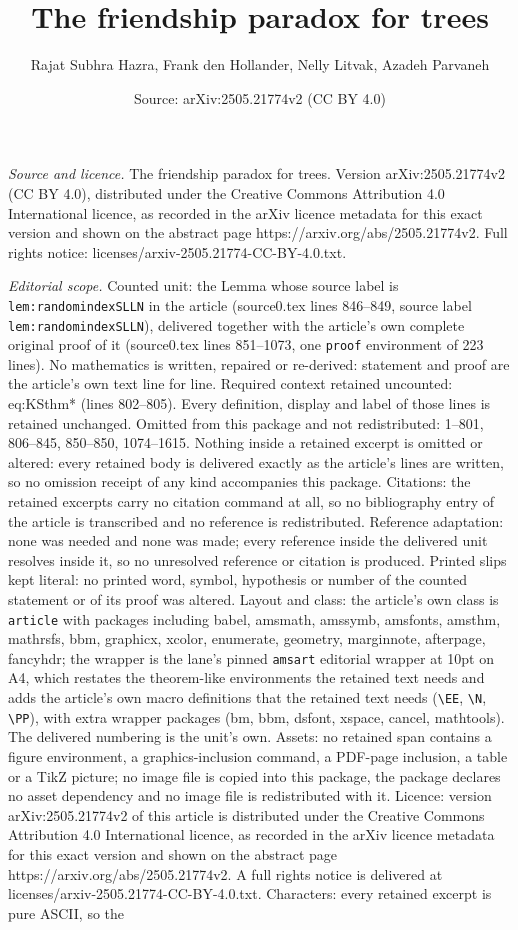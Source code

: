 \documentclass[10pt,a4paper]{amsart}
\title[The friendship paradox for trees]{The friendship paradox for trees}
\author{Rajat Subhra Hazra, Frank den Hollander, Nelly Litvak, Azadeh Parvaneh}
\date{Source: arXiv:2505.21774v2 (CC BY 4.0)}
\begin{document}
\maketitle

\noindent\emph{Source and licence.} The friendship paradox for trees. Version arXiv:2505.21774v2 (CC BY 4.0), distributed under the Creative Commons Attribution 4.0 International licence, as recorded in the arXiv licence metadata for this exact version and shown on the abstract page https://arxiv.org/abs/2505.21774v2. Full rights notice: licenses/arxiv-2505.21774-CC-BY-4.0.txt.\par\smallskip

\noindent\textit{Editorial scope.} Counted unit: the Lemma whose source label is \texttt{lem:randomindexSLLN} in the article (source0.tex lines 846--849, source label \texttt{lem:randomindexSLLN}), delivered together with the article's own complete original proof of it (source0.tex lines 851--1073, one \texttt{proof} environment of 223 lines). No mathematics is written, repaired or re-derived: statement and proof are the article's own text line for line. Required context retained uncounted: eq:KSthm* (lines 802--805). Every definition, display and label of those lines is retained unchanged. Omitted from this package and not redistributed: 1--801, 806--845, 850--850, 1074--1615. Nothing inside a retained excerpt is omitted or altered: every retained body is delivered exactly as the article's lines are written, so no omission receipt of any kind accompanies this package. Citations: the retained excerpts carry no citation command at all, so no bibliography entry of the article is transcribed and no reference is redistributed. Reference adaptation: none was needed and none was made; every reference inside the delivered unit resolves inside it, so no unresolved reference or citation is produced. Printed slips kept literal: no printed word, symbol, hypothesis or number of the counted statement or of its proof was altered. Layout and class: the article's own class is \texttt{article} with packages including babel, amsmath, amssymb, amsfonts, amsthm, mathrsfs, bbm, graphicx, xcolor, enumerate, geometry, marginnote, afterpage, fancyhdr; the wrapper is the lane's pinned \texttt{amsart} editorial wrapper at 10pt on A4, which restates the theorem-like environments the retained text needs and adds the article's own macro definitions that the retained text needs (\texttt{\textbackslash EE}, \texttt{\textbackslash N}, \texttt{\textbackslash PP}), with extra wrapper packages (bm, bbm, dsfont, xspace, cancel, mathtools). The delivered numbering is the unit's own. Assets: no retained span contains a figure environment, a graphics-inclusion command, a PDF-page inclusion, a table or a TikZ picture; no image file is copied into this package, the package declares no asset dependency and no image file is redistributed with it. Licence: version arXiv:2505.21774v2 of this article is distributed under the Creative Commons Attribution 4.0 International licence, as recorded in the arXiv licence metadata for this exact version and shown on the abstract page https://arxiv.org/abs/2505.21774v2. A full rights notice is delivered at licenses/arxiv-2505.21774-CC-BY-4.0.txt. Characters: every retained excerpt is pure ASCII, so the 
\end{document}
